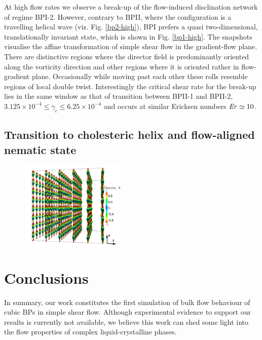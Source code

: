 \documentclass[aps,pre,reprint,superscriptaddress, twocolumn]{revtex4}
\newcommand{\e}[1]{\times10^{#1}}
\newcommand{\gd}{\dot{\gamma}}
\begin{document}
At high flow rates we observe a break-up of the flow-induced 
disclination network of regime BPI-2. However, 
contrary to BPII, where the configuration is a travelling helical 
wave (viz. Fig. \ref{bp2-high}), BPI prefers a quasi 
two-dimensional, translationally invariant state, which is shown in 
Fig. \ref{bp1-high}. The snapshots visualise the affine 
transformation of simple shear flow in the gradient-flow plane.
There are distinctive regions where the director field is 
predominantly oriented along the vorticity direction and 
other regions where it is oriented rather in flow-gradient plane. 
Occasionally while moving past each other these rolls resemble 
regions of local double twist.
Interestingly the critical shear rate for the break-up lies in the same 
window as that of transition between BPII-1 and BPII-2, 
 $3.125\e{-4}\le\gd_c\le 6.25\e{-4}$ and occurs at similar 
Ericksen numbers ${\it Er}\simeq 10$.

\subsection{Transition to cholesteric helix and flow-aligned nematic state}

\begin{figure}[htpb]
\includegraphics[width=0.45\textwidth]{dir3d+y-200k_run1179.png}
\caption{}
\label{cholflow}
\end{figure}


\clearpage

\section{Conclusions}

In summary, our work constitutes the first simulation of bulk flow behaviour 
of cubic BPs in simple shear flow. Although experimental evidence to support
our results is currently not available, we believe this work can shed some light into the 
flow properties of complex liquid-crystalline phases.
  
\end{document}

